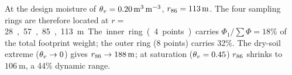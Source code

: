 At the design moisture of
$\theta_v = \SI{0.20}{\cubic\metre\per\cubic\metre}$,
$r_{86} = \SI{113}{\metre}$.
The four sampling rings are therefore located at
$r = $ \SI{28}, \SI{57}, \SI{85}, \SI{113} m.
The inner ring (4 points) carries $\Phi_1 / \sum \Phi = 18\%$ of
the total footprint weight; the outer ring (8 points) carries 32\%.
The dry-soil extreme ($\theta_v \to 0$) gives
$r_{86} \to \SI{188}{\metre}$; at saturation
($\theta_v = 0.45$) $r_{86}$ shrinks to $\SI{106}{\metre}$,
a 44\% dynamic range.
